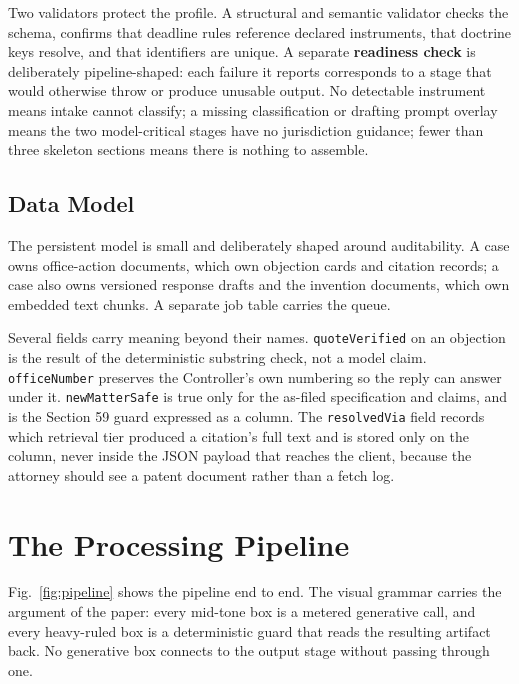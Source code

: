 \documentclass[conference]{IEEEtran}
\newcommand{\code}[1]{\texttt{\small #1}}
\begin{document}
Two validators protect the profile. A structural and semantic validator checks the schema, confirms that deadline rules reference declared instruments, that doctrine keys resolve, and that identifiers are unique. A separate \textbf{readiness check} is deliberately pipeline-shaped: each failure it reports corresponds to a stage that would otherwise throw or produce unusable output. No detectable instrument means intake cannot classify; a missing classification or drafting prompt overlay means the two model-critical stages have no jurisdiction guidance; fewer than three skeleton sections means there is nothing to assemble.

\subsection{Data Model}

The persistent model is small and deliberately shaped around auditability. A case owns office-action documents, which own objection cards and citation records; a case also owns versioned response drafts and the invention documents, which own embedded text chunks. A separate job table carries the queue.

Several fields carry meaning beyond their names. \code{quoteVerified} on an objection is the result of the deterministic substring check, not a model claim. \code{officeNumber} preserves the Controller's own numbering so the reply can answer under it. \code{newMatterSafe} is true only for the as-filed specification and claims, and is the Section 59 guard expressed as a column. The \code{resolvedVia} field records which retrieval tier produced a citation's full text and is stored only on the column, never inside the JSON payload that reaches the client, because the attorney should see a patent document rather than a fetch log.

\section{The Processing Pipeline}
\label{sec:pipeline}

Fig.~\ref{fig:pipeline} shows the pipeline end to end. The visual grammar carries the argument of the paper: every mid-tone box is a metered generative call, and every heavy-ruled box is a deterministic guard that reads the resulting artifact back. No generative box connects to the output stage without passing through one.
\end{document}

